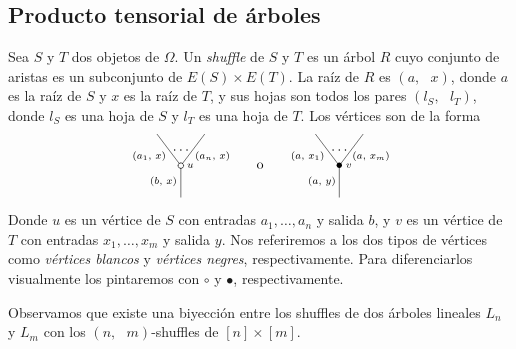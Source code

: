 \documentclass[../main.tex]{subfiles}
\begin{document}
\subsection{Producto tensorial de \'arboles}
\begin{defi}
    Sea $S$ y $T$ dos objetos de $\Omega$. Un \emph{shuffle} de $S$ y $T$ es un \'arbol $R$ cuyo conjunto de aristas es un subconjunto de $E(S)\times E(T)$. La ra\'iz de $R$ es $(a,\text{ }x)$, donde $a$ es la ra\'iz de $S$ y $x$ es la ra\'iz de $T$,
    y sus hojas son todos los pares $(l_S,\text{ }l_T)$, donde $l_S$ es una hoja de $S$ y $l_T$ es una hoja de $T$. Los v\'ertices son de la forma
    $$
        \xy
        <0.08cm, 0cm>:
        (0.0, 0.0)*{}="1"; %
        (0.0, 10.0)*\cir<2pt>{}="2"; %
        (-7.5, 20.0)*{}="3"; %
        (7.5, 20.0)*{}="4"; %
        "1";"2" **\dir{-};
        "2";"3" **\dir{-};
        "2";"4" **\dir{-};
        (3.0, 10.0)*=0{\scriptstyle u};
        (-5.5, 5)*=0{\scriptstyle (b,\text{ }x)};
        (-10, 13.0)*=0{\scriptstyle (a_1,\text{ }x)};
        (10, 13.0)*=0{\scriptstyle (a_n,\text{ }x)};
        (0,15)*{\dots};
        \endxy
        \xy
        <0.08cm, 0cm>:
        (-15, 0.0)*{}="1";
        (15, 10.0)*{}="2";
        (0,10)*{\rm o};
        \endxy
        \xy
        <0.08cm, 0cm>:
        (0.0, 0.0)*{}="1"; %
        (0.0, 10.0)*=0{\bullet}="2"; %
        (-7.5, 20.0)*{}="3"; %
        (7.5, 20.0)*{}="4"; %
        "1";"2" **\dir{-};
        "2";"3" **\dir{-};
        "2";"4" **\dir{-};
        (3.0, 10.0)*=0{\scriptstyle v};
        (-5.5, 5)*=0{\scriptstyle (a,\text{ }y)};
        (-10, 13.0)*=0{\scriptstyle (a,\text{ }x_1)};
        (10, 13.0)*=0{\scriptstyle (a,\text{ }x_m)};
        (0,15)*{\dots};
        \endxy
    $$
    Donde $u$ es un v\'ertice de $S$ con entradas $a_1,\dots,a_n$ y salida $b$, y $v$ es un v\'ertice de $T$ con entradas $x_1,\dots,x_m$ y salida $y$. Nos referiremos a los dos tipos de v\'ertices como \emph{v\'ertices blancos} y \emph{v\'ertices negres}, respectivamente. Para diferenciarlos visualmente los pintaremos con $\circ$ y $\bullet$, respectivamente.

    Observamos que existe una biyecci\'on entre los shuffles de dos \'arboles lineales $L_n$ y $L_m$ con los $(n,\text{ }m)$-shuffles de $[n]\times[m]$.
\end{defi}
\end{document}

